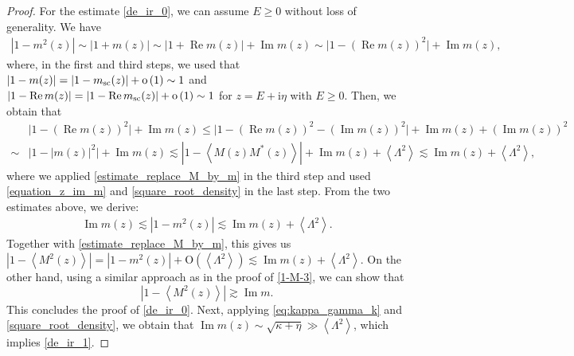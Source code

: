 \documentclass[10pt,reqno]{amsart}
\numberwithin{equation}{section}
\numberwithin{figure}{section}
\theoremstyle{plain} %
\theoremstyle{definition} %
\renewcommand{\txt}[1]{\text{\rm{#1}}}
\newcommand{\ii}{\mathrm{i}}
\renewcommand{\leq}{\le}
\renewcommand{\geq}{\ge}
\newcommand{\pa}[1]{\left({#1}\right)}
\newcommand{\absa}[1]{\left\lvert #1 \right\rvert}
\newcommand{\avga}[1]{\left\langle #1 \right\rangle}
\DeclareMathOperator{\re}{\mathrm{Re}}
\DeclareMathOperator{\im}{\mathrm{Im}}
\newcommand{\oo}{\mathrm{o}}
\newcommand{\OO}{\mathrm{O}}
\numberwithin{equation}{section}
\begin{document}
\begin{proof}
For the estimate \eqref{de_ir_0}, we can assume $E\geq 0$ without loss of generality. We have
     \begin{equation}\nonumber
         \begin{aligned}
             \absa{1-m^2 (z) }\sim \absa{1+m (z) }\sim\absa{1+\re m (z) }+\im m (z) \sim  \big|1-\pa{\re m (z) }^2\big| +\im m (z) ,
         \end{aligned}
     \end{equation}
     where, in the first and third steps, we used that $\absa{1-m (z) }=\absa{1-m_{\txt{sc}} (z) }+\oo\pa{1}\sim 1$ and $\absa{1-\re m (z) }=\absa{1-\re m_{\txt{sc}} (z) }+\oo\pa{1}\sim 1$ for $z=E+\ii \eta$ with $E\geq 0$. Then, we obtain that 
     \begin{equation}\nonumber
         \begin{aligned}
             &\big|1-\pa{\re m (z) }^2\big|+\im m (z) \leq \big|1-\pa{\re m (z) }^2-\pa{\im m (z) }^2\big|+\im m (z) +\pa{\im m (z) }^2\\
             \sim& \big|1-\absa{m (z) }^2\big|+\im m (z) \lesssim \absa{1-\avga{M (z) M^* (z) }}+\im m (z) +\avga{\Lambda^2}\lesssim \im m (z) +\avga{\Lambda^2},
         \end{aligned}
     \end{equation}
     where we applied \eqref{estimate_replace_M_by_m} in the third step and used \eqref{equation_z_im_m} and \eqref{square_root_density} in the last step. From the two estimates above, we derive:
     \begin{equation}\nonumber
         \begin{aligned}
             \im m (z) \lesssim\absa{1-m^2 (z) }\lesssim \im m (z) +\avga{\Lambda^2}.
         \end{aligned}
     \end{equation}
Together with \eqref{estimate_replace_M_by_m}, this gives us $\absa{1-\avga{M^2 (z) }}=\absa{1-m^2 (z) }+ \OO\pa{\avga{\Lambda^2}}\lesssim \im m (z) +\avga{\Lambda^2}$.
    On the other hand, using a similar approach as in the proof of \eqref{1-M-3}, we can show that \[\absa{1-\avga{M^2 (z) }}\gtrsim \im m.\] %
    This concludes the proof of \eqref{de_ir_0}. Next, applying \eqref{eq:kappa_gamma_k} and \eqref{square_root_density}, we obtain that $\im m (z)\sim \sqrt{\kappa+\eta} \gg \avga{\Lambda^2}$, which implies \eqref{de_ir_1}.
    


\end{proof}
\end{document}
